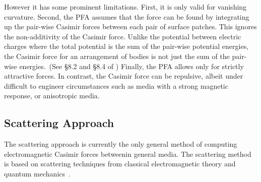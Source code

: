 However it has some prominent limitations.
First, it is only valid for vanishing curvature.
Second, the PFA assumes that the force can be found by integrating up
the pair-wise Casimir forces between each pair of surface patches.  This ignores the non-additivity
of the Casimir force.  Unlike the potential between electric charges where the total potential is
the sum of the pair-wise potential energies, the Casimir force for an arrangement
of bodies is not just the sum of the pair-wise energies.~(See \S{8.2} and \S{8.4} of \cite{Milonni1994})
Finally, the PFA allows only for strictly attractive forces.  
In contrast, the Casimir force can be repulsive, albeit under difficult to engineer circumstances 
such as media with a strong magnetic response, or anisotropic media.


\subsection{Scattering Approach}

The scattering approach is currently the only general method of computing 
electromagnetic Casimir forces betweenin general media.  The scattering method 
is based on scattering techniques from classical electromagnetic theory and quantum mechanics~\cite{Rahi2009}.

